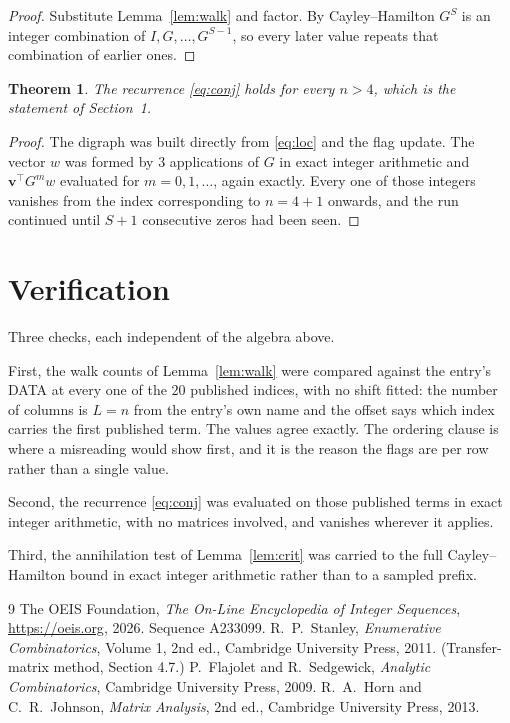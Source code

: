 \documentclass[11pt,a4paper]{article}
\theoremstyle{plain}
\newtheorem{theorem}{Theorem}
\theoremstyle{definition}
\begin{document}
\begin{proof}
Substitute Lemma~\ref{lem:walk} and factor. By Cayley--Hamilton $G^{S}$ is an integer
combination of $I,G,\dots,G^{S-1}$, so every later value repeats that combination of earlier
ones.
\end{proof}

\begin{theorem}
The recurrence \eqref{eq:conj} holds for every $n>4$, which is the statement of
Section~1.
\end{theorem}

\begin{proof}
The digraph was built directly from \eqref{eq:loc} and the flag update. The vector $w$ was
formed by $3$ applications of $G$ in exact integer arithmetic and
$\mathbf{v}^{\!\top}G^{m}w$ evaluated for $m=0,1,\dots$, again exactly. Every one of
those integers vanishes from the index corresponding to $n=4+1$ onwards, and the run
continued until $S+1$ consecutive zeros had been seen.
\end{proof}

\section{Verification}

Three checks, each independent of the algebra above.

First, the walk counts of Lemma~\ref{lem:walk} were compared against the entry's DATA at
every one of the $20$ published indices, with no shift fitted: the number of columns is
$L=n$ from the entry's own name and the offset says which index carries the first
published term. The values agree exactly. The ordering clause is where a misreading would
show first, and it is the reason the flags are per row rather than a single value.

Second, the recurrence \eqref{eq:conj} was evaluated on those published terms in exact
integer arithmetic, with no matrices involved, and vanishes wherever it applies.

Third, the annihilation test of Lemma~\ref{lem:crit} was carried to the full
Cayley--Hamilton bound in exact integer arithmetic rather than to a sampled prefix.

\begin{thebibliography}{9}
 The OEIS Foundation, \emph{The On-Line Encyclopedia of Integer
Sequences}, \url{https://oeis.org}, 2026. Sequence A233099.
 R.~P.~Stanley, \emph{Enumerative Combinatorics}, Volume 1, 2nd ed.,
Cambridge University Press, 2011. (Transfer-matrix method, Section 4.7.)
 P.~Flajolet and R.~Sedgewick, \emph{Analytic Combinatorics}, Cambridge
University Press, 2009.
 R.~A.~Horn and C.~R.~Johnson, \emph{Matrix Analysis}, 2nd ed., Cambridge
University Press, 2013.
\end{thebibliography}
\end{document}
